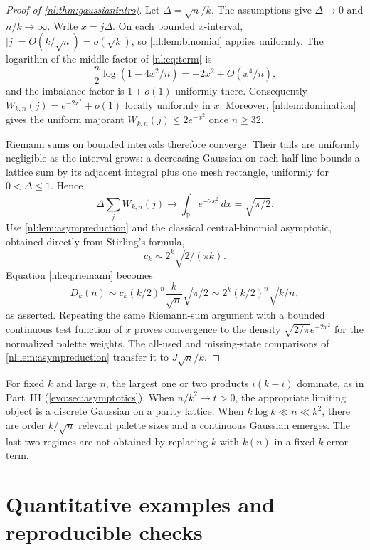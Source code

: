 \documentclass[11pt,a4paper]{article}
\numberwithin{equation}{section}
\theoremstyle{definition}
\theoremstyle{remark}
\begin{document}
\begin{proof}[Proof of \cref{nl:thm:gaussianintro}]
Let $\Delta=\sqrt n/k$. The assumptions give $\Delta\to0$ and $n/k\to\infty$.
Write $x=j\Delta$. On each bounded $x$-interval,
$|j|=O(k/\sqrt n)=o(\sqrt k)$, so \cref{nl:lem:binomial} applies uniformly.
The logarithm of the middle factor of \eqref{nl:eq:term} is
\[
 \frac n2\log(1-4x^2/n)=-2x^2+O(x^4/n),
\]
and the imbalance factor is $1+o(1)$ uniformly there.
Consequently $W_{k,n}(j)=e^{-2x^2}+o(1)$ locally uniformly in $x$.
Moreover, \cref{nl:lem:domination} gives the uniform majorant
$W_{k,n}(j)\le2e^{-x^2}$ once $n\ge32$.

Riemann sums on bounded intervals therefore converge. Their tails are
uniformly negligible as the interval grows: a decreasing Gaussian on each
half-line bounds a lattice sum by its adjacent integral plus one mesh
rectangle, uniformly for $0<\Delta\le1$. Hence
\begin{equation}\label{nl:eq:riemann}
 \Delta\sum_jW_{k,n}(j)\longrightarrow
 \int_{\mathbb R}e^{-2x^2}\,dx=\sqrt{\pi/2}.
\end{equation}
Use \cref{nl:lem:asympreduction} and the classical central-binomial
asymptotic, obtained directly from Stirling's formula,
\[
 c_k\sim2^k\sqrt{2/(\pi k)}.
\]
Equation \eqref{nl:eq:riemann} becomes
\[
 D_k(n)\sim c_k(k/2)^n\frac{k}{\sqrt n}\sqrt{\pi/2}
 \sim2^k(k/2)^n\sqrt{k/n},
\]
as asserted. Repeating the same Riemann-sum argument with a bounded
continuous test function of $x$ proves convergence to the density
$\sqrt{2/\pi}e^{-2x^2}$ for the normalized palette weights.
The all-used and missing-state comparisons of \cref{nl:lem:asympreduction}
transfer it to $J\sqrt n/k$.
\end{proof}

\begin{remark}
For fixed $k$ and large $n$, the largest one or two products $i(k-i)$
dominate, as in Part~III (\cref{evo:sec:asymptotics}). When $n/k^2\to t>0$, the appropriate
limiting object is a discrete Gaussian on a parity lattice. When
$k\log k\ll n\ll k^2$, there are order $k/\sqrt n$ relevant palette sizes
and a continuous Gaussian emerges. The last two regimes are not obtained
by replacing $k$ with $k(n)$ in a fixed-$k$ error term.
\end{remark}

\section{Quantitative examples and reproducible checks}\label{nl:sec:checks}
\end{document}
